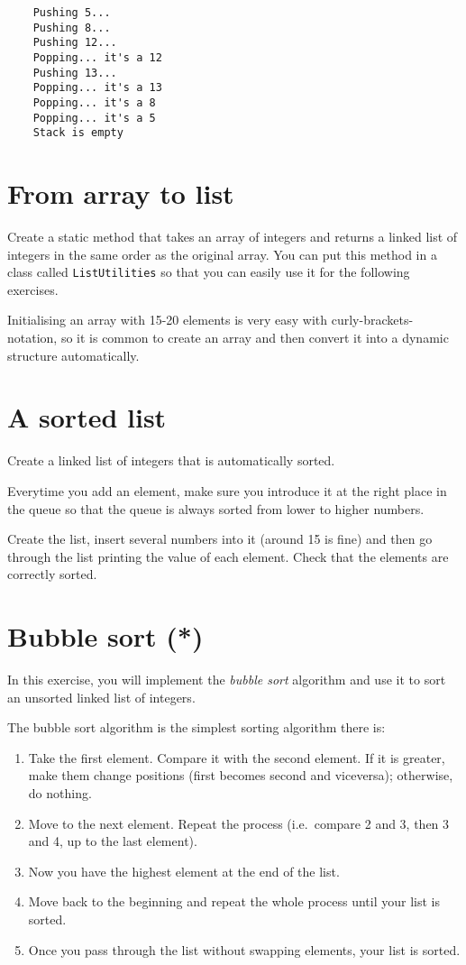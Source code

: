 \documentclass{article}
\begin{document}
\begin{verbatim}
    Pushing 5...
    Pushing 8...
    Pushing 12...
    Popping... it's a 12
    Pushing 13...
    Popping... it's a 13
    Popping... it's a 8
    Popping... it's a 5
    Stack is empty
\end{verbatim}

\section{From array to list}
\label{sec:from-array-string}

Create a static method that takes an array of integers and returns a
linked list of integers in the same order as the original array. You
can put this method in a class called \verb+ListUtilities+ so that you
can easily use it for the following exercises. 

Initialising an array with 15-20 elements is very easy with
curly-brackets-notation, so it is 
common to create an array and then convert it into a dynamic structure
automatically. 

\section{A sorted list}
\label{sec:sorted-list}

Create a linked list of integers that is automatically sorted. 

Everytime you add an element, make sure you introduce it at the right
place in the queue so that the queue is always sorted from lower to
higher numbers. 

Create the list, insert several numbers into it (around 15 is fine)
and then go through the list printing the value of each element. Check
that the elements are correctly sorted.


\section{Bubble sort (*)}
\label{sec:bubble-sort}

In this exercise, you will implement the \emph{bubble sort} algorithm
and use it to sort an unsorted linked list of integers. 

The bubble sort algorithm is the simplest sorting algorithm there is: 

\begin{enumerate}
\item Take the first element. Compare it with the second element. If
  it is greater, make them change positions (first becomes second and
  viceversa); otherwise, do nothing.
\item Move to the next element. Repeat the process (i.e.~compare 2 and
  3, then 3 and 4, up to the last element).
\item Now you have the highest element at the end of the list.
\item Move back to the beginning and repeat the whole process until
  your list is sorted.
\item Once you pass through the list without swapping elements, your
  list is sorted. 
\end{enumerate}
\end{document}
